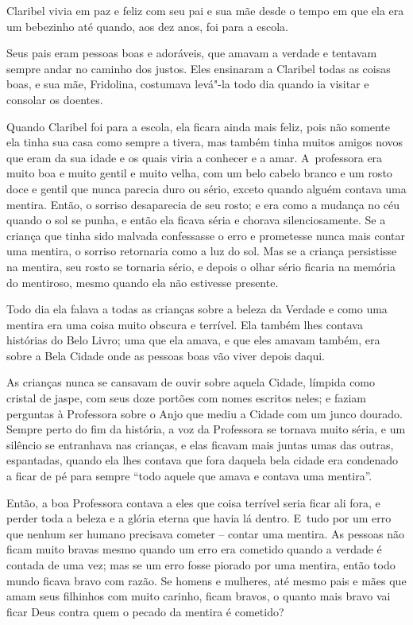  

Claribel vivia em paz e feliz com seu pai e sua mãe desde o tempo em que
ela era um bebezinho até quando, aos dez anos, foi para a escola.

Seus pais eram pessoas boas e adoráveis, que amavam a verdade e tentavam
sempre andar no caminho dos justos. Eles ensinaram a Claribel todas as
coisas boas, e sua mãe, Fridolina, costumava levá"-la todo dia quando ia
visitar e consolar os doentes.

Quando Claribel foi para a escola, ela ficara ainda mais feliz, pois não
somente ela tinha sua casa como sempre a tivera, mas também tinha muitos
amigos novos que eram da sua idade e os quais viria a conhecer e a amar.
A~professora era muito boa e muito gentil e muito velha, com um belo
cabelo branco e um rosto doce e gentil que nunca parecia duro ou sério,
exceto quando alguém contava uma mentira. Então, o sorriso desaparecia
de seu rosto; e era como a mudança no céu quando o sol se punha, e então
ela ficava séria e chorava silenciosamente. Se a criança que tinha sido
malvada confessasse o erro e prometesse nunca mais contar uma mentira, o
sorriso retornaria como a luz do sol. Mas se a criança persistisse na
mentira, seu rosto se tornaria sério, e depois o olhar sério ficaria na
memória do mentiroso, mesmo quando ela não estivesse presente.

Todo dia ela falava a todas as crianças sobre a beleza da Verdade e como
uma mentira era uma coisa muito obscura e terrível. Ela também lhes
contava histórias do Belo Livro; uma que ela amava, e que eles amavam
também, era sobre a Bela Cidade onde as pessoas boas vão viver depois
daqui.

As crianças nunca se cansavam de ouvir sobre aquela Cidade, límpida como
cristal de jaspe, com seus doze portões com nomes escritos neles; e
faziam perguntas à Professora sobre o Anjo que mediu a Cidade com um
junco dourado. Sempre perto do fim da história, a voz da Professora se
tornava muito séria, e um silêncio se entranhava nas crianças, e elas
ficavam mais juntas umas das outras, espantadas, quando ela lhes contava
que fora daquela bela cidade era condenado a ficar de pé para sempre
``todo aquele que amava e contava uma mentira''.

Então, a boa Professora contava a eles que coisa terrível seria ficar
ali fora, e perder toda a beleza e a glória eterna que havia lá dentro.
E~tudo por um erro que nenhum ser humano precisava cometer -- contar uma
mentira. As pessoas não ficam muito bravas mesmo quando um erro era
cometido quando a verdade é contada de uma vez; mas se um erro fosse
piorado por uma mentira, então todo mundo ficava bravo com razão. Se
homens e mulheres, até mesmo pais e mães que amam seus filhinhos com
muito carinho, ficam bravos, o quanto mais bravo vai ficar Deus contra
quem o pecado da mentira é cometido?

